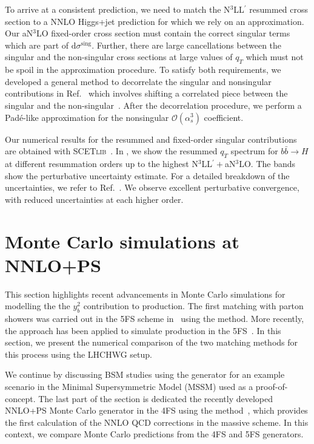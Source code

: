 \documentclass[11pt,a4paper]{article}
\begin{document}
To arrive at a consistent prediction, we need to match the N$^3$LL$^{\prime}$ resummed cross section to a NNLO Higgs+jet prediction for which we rely on an approximation. 
Our aN$^3$LO fixed-order cross section must contain the correct singular terms which are part of $\mathrm{d} \sigma^\mathrm{sing}$.
Further, there are large cancellations between the singular and the non-singular cross sections at large values of $q_T$ which must not be spoil in the approximation procedure.
To satisfy both requirements,
we developed a general method to decorrelate the singular and nonsingular contributions in Ref.~\cite{Cal:2023mib} which involves shifting a correlated piece between the singular and the non-singular~\cite{Dehnadi:2022prz}.
After the decorrelation procedure, we perform a Pad\'e-like approximation for the nonsingular $\mathcal{O}\left(\alpha_s^3\right)$ coefficient. 

Our numerical results for the
resummed and fixed-order singular contributions are obtained with
\textsc{SCETlib}~\cite{scetlib}.
In , we show the resummed $q_T$ spectrum for $b\bar{b}\to H$ at different resummation orders up to the highest N$^3$LL$^{\prime}+$aN$^3$LO. The bands show the perturbative uncertainty estimate. For a detailed breakdown of the uncertainties, we refer to Ref.~\cite{Cal:2023mib}. We observe excellent perturbative convergence, with reduced uncertainties at each higher order. 

\section{Monte Carlo simulations at NNLO+PS}\label{sec:MCyb}
This section highlights recent advancements in Monte Carlo simulations for modelling the the $y_b^2$ contribution to \bbH{} production. The first matching with parton showers was carried out in the 5FS scheme in~ using the \minnlo{} method. More recently, the \GENEVA{} approach has been applied to 
simulate \bbtoH{} production in the 5FS~\cite{Gavardi:2025zpf}. In this section, we present the numerical comparison of the two matching 
methods for this process using the LHCHWG setup.

We continue by discussing BSM studies using the \minnlo{} generator for an example scenario in the Minimal Supersymmetric Model (MSSM) used as a proof-of-concept. 
The last part of the section is dedicated the recently developed NNLO+PS Monte Carlo generator in the 4FS using the \minnlo{} method~\cite{Biello:2024pgo}, 
which provides the first calculation of the NNLO QCD corrections in the massive scheme. In this context, we compare Monte Carlo predictions from the 
4FS and 5FS \minnlo{} generators.
\end{document}

